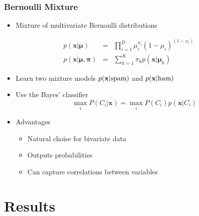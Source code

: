 \documentclass{beamer}
\begin{document}
\frame
{
  \frametitle{Bernoulli Mixture}

  \begin{itemize}
    \item Mixture of multivariate Bernoulli distributions
  \end{itemize}
  \begin{eqnarray*}
    p(\mathbf{x}|\boldsymbol\mu) &=& \prod_{i=1}^D \mu_i^{x_i}(1-\mu_i)^{(1-x_i)} \\
    p(\mathbf{x}|\boldsymbol\mu,\boldsymbol\pi) &=& \sum_{k=1}^K \pi_kp(\mathbf{x}|\boldsymbol\mu_k)
  \end{eqnarray*}
  \begin{itemize}
  \item Learn two mixture models $p(\mathbf{x}|\textmd{spam})$ and $p(\mathbf{x}|\textmd{ham})$
  \item Use the Bayes' classifier 
  \begin{equation}
  \max_i P(C_i|\mathbf{x}) = \max_i P(C_i)p(\mathbf{x}|C_i)
  \end{equation}
  \item Advantages
  \begin{itemize}
    \item Natural choise for bivariate data
    \item Outputs probabilities
    \item Can capture correlations between variables
  \end{itemize}
  \end{itemize}

}

\section{Results}
\end{document}
